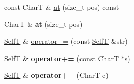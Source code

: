 \begin{CompactItemize}
\item 
const CharT \& \hyperlink{classbbt__string_96366cce7bcb5045b562135e6bc20444}{at} (size\_\-t pos) const 
\item 
\hypertarget{classbbt__string_a8b554c14086660f7efdd082d531897e}{
CharT \& \textbf{at} (size\_\-t pos)}
\label{classbbt__string_a8b554c14086660f7efdd082d531897e}

\item 
\hyperlink{classbbt__string}{SelfT} \& \hyperlink{classbbt__string_0b1409c335c490f060472fe47c90cfd2}{operator+=} (const \hyperlink{classbbt__string}{SelfT} \&str)
\item 
\hypertarget{classbbt__string_9b47bcff9c90516e8a0bd9d3d17d2483}{
\hyperlink{classbbt__string}{SelfT} \& \textbf{operator+=} (const CharT $\ast$s)}
\label{classbbt__string_9b47bcff9c90516e8a0bd9d3d17d2483}

\item 
\hypertarget{classbbt__string_2b3c375e032bf7e5eade2ca5a7a301d0}{
\hyperlink{classbbt__string}{SelfT} \& \textbf{operator+=} (CharT c)}
\label{classbbt__string_2b3c375e032bf7e5eade2ca5a7a301d0}


\end{CompactItemize}

